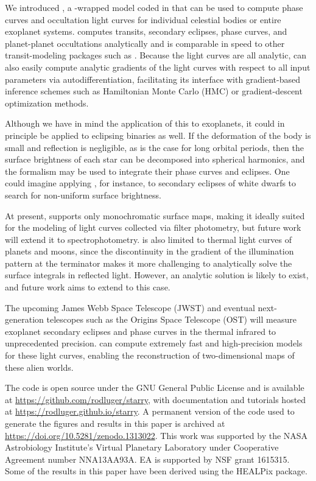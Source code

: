 \documentclass[modern]{aastex61}
\begin{document}
We introduced \starry, a \Python-wrapped model coded in \cpp
that can be used to compute phase curves and occultation light curves for
individual celestial bodies or entire exoplanet systems. \starry computes
transits, secondary eclipses, phase curves, and planet-planet occultations
analytically and is comparable in speed to other transit-modeling packages such
as \batman \citep{Kreidberg2015}. Because the light curves are all analytic,
\starry can also easily compute analytic gradients of the light curves with respect
to all input parameters via autodifferentiation, facilitating its interface with
gradient-based inference schemes such as Hamiltonian Monte Carlo (HMC)
or gradient-descent optimization methods.

Although we have in mind the application of this \starry to exoplanets, it could
in principle be applied to eclipsing binaries as well.  If the deformation of
the body is small and reflection is negligible, as is the case for long orbital periods,
then the surface brightness of each star can be decomposed into spherical harmonics,
and the \starry formalism may be used to integrate their phase curves and eclipses.
One could imagine applying \starry, for instance, to secondary eclipses of white
dwarfs to search for non-uniform surface brightness.

At present, \starry supports only
monochromatic surface maps, making it ideally suited for the modeling of
light curves collected via filter photometry, but future work will extend
it to spectrophotometry. \starry is also limited to thermal light curves of
planets and moons, since the discontinuity in the gradient of the
illumination pattern at the terminator makes it more challenging to analytically
solve the surface integrals in reflected light. However, an analytic solution
is likely to exist, and future work aims to extend \starry to this case.

The upcoming James Webb Space Telescope (JWST) and eventual
next-generation telescopes such as the Origins Space Telescope (OST) will
measure exoplanet secondary eclipses and
phase curves in the thermal infrared to unprecedented precision. \starry
can compute extremely fast and high-precision models for these
light curves, enabling the reconstruction of two-dimensional maps of these
alien worlds.


\acknowledgments
The \starry code is open source under the GNU General Public License
and is available at \url{https://github.com/rodluger/starry}, with
documentation and tutorials hosted at \url{https://rodluger.github.io/starry}.
A permanent version of the code used to generate the figures and results in this
paper is archived at \url{https://doi.org/10.5281/zenodo.1313022}.
This work was supported by the NASA Astrobiology
Institute's Virtual Planetary Laboratory under Cooperative
Agreement number NNA13AA93A.  EA is supported by NSF grant 1615315.
%
Some of the results in this paper have been derived using the HEALPix
\citep{Gorski2005} package.
\end{document}
